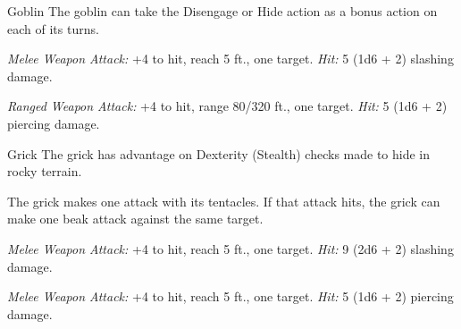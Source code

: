 \documentclass[10pt,a4paper,twoside,bg=print,twocolumn,openany,nodeprecatedcode]{dndbook}
\begin{document}
\begin{DndMonster}[float=t]{Goblin}
\DndMonsterBasics[
armor-class = {15 (\textit{leather armor})},
hit-points = {\DndDice{2d6}},
speed = {30 ft.}
]
\DndMonsterAbilityScores[
 str = 8,
 dex = 14,
 con = 10,
 int = 10,
 wis = 8,
 cha = 8
]
\DndMonsterDetails[
skills = {Stealth +6},
senses = {darkvision 60 ft., passive perception 9},
languages = {Common, Goblin},
challenge = 1/4,
]
The goblin can take the Disengage or Hide action as a bonus action on each of its turns.

\par
{}
\textsl{Melee Weapon Attack:} +4 to hit, reach 5 ft., one target. \textsl{Hit:} 5 (1d6 + 2) slashing damage.

\textsl{Ranged Weapon Attack:} +4 to hit, range 80/320 ft., one target. \textsl{Hit:} 5 (1d6 + 2) piercing damage.

\end{DndMonster}



\begin{DndMonster}[float=t]{Grick}
\DndMonsterBasics[
armor-class = {14 (natural armor)},
hit-points = {\DndDice{6d8}},
speed = {30 ft., climb 30 ft.}
]
\DndMonsterAbilityScores[
 str = 14,
 dex = 14,
 con = 11,
 int = 3,
 wis = 14,
 cha = 5
]
\DndMonsterDetails[
damage-resistances = {; bludgeoning, piercing, slashing from nonmagical attacks},
senses = {darkvision 60 ft., passive perception 12},
challenge = 2,
]
The grick has advantage on Dexterity (Stealth) checks made to hide in rocky terrain.

\par
{}
The grick makes one attack with its tentacles. If that attack hits, the grick can make one beak attack against the same target.

\textsl{Melee Weapon Attack:} +4 to hit, reach 5 ft., one target. \textsl{Hit:} 9 (2d6 + 2) slashing damage.

\textsl{Melee Weapon Attack:} +4 to hit, reach 5 ft., one target. \textsl{Hit:} 5 (1d6 + 2) piercing damage.

\end{DndMonster}
\end{document}
